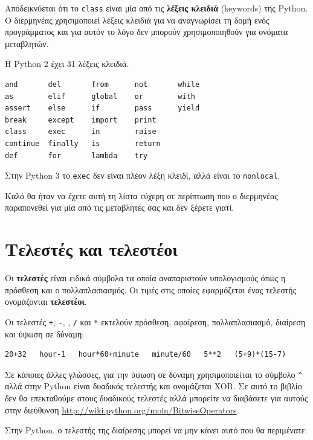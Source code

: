 \documentclass[10pt]{book}
\begin{document}
Αποδεικνύεται ότι το {\tt class} είναι μία από τις {\bf λέξεις κλειδιά} (keywords) της Python. Ο διερμηνέας χρησιμοποιεί λέξεις κλειδιά για να αναγνωρίσει τη δομή ενός προγράμματος και για αυτόν το λόγο δεν μπορούν χρησιμοποιηθούν για ονόματα μεταβλητών.


Η Python 2 έχει 31 λέξεις κλειδιά.

\begin{verbatim}
and       del       from      not       while
as        elif      global    or        with
assert    else      if        pass      yield
break     except    import    print
class     exec      in        raise
continue  finally   is        return
def       for       lambda    try
\end{verbatim}
%

Στην Python 3 το {\tt exec} δεν είναι πλέον λέξη κλειδί, αλλά είναι το 
{\tt nonlocal}.

Καλό θα ήταν να έχετε αυτή τη λίστα εύχερη σε περίπτωση που ο διερμηνέας παραπονεθεί για μία από τις μεταβλητές σας και δεν ξέρετε γιατί.


\section{Τελεστές και τελεστέοι}

Οι {\bf τελεστές} είναι ειδικά σύμβολα τα οποία αναπαριστούν υπολογισμούς
όπως η πρόσθεση και ο πολλαπλασιασμός. Οι τιμές στις οποίες εφαρμόζεται
ένας τελεστής ονομάζονται {\bf τελεστέοι}.

Οι τελεστές {\tt +}, {\tt -}, {\tt *}, {\tt /} και {\tt **}
εκτελούν πρόσθεση, αφαίρεση, πολλαπλασιασμό, διαίρεση και ύψωση σε
δύναμη:


\begin{verbatim}
20+32   hour-1   hour*60+minute   minute/60   5**2   (5+9)*(15-7)
\end{verbatim}
%

Σε κάποιες άλλες γλώσσες, για την ύψωση σε δύναμη χρησιμοποιείται το
σύμβολο \verb"^" αλλά στην Python είναι δυαδικός
τελεστής και ονομάζεται XOR. Σε αυτό το βιβλίο δεν θα επεκταθούμε
στους δυαδικούς τελεστές αλλά μπορείτε να διαβάσετε για αυτούς στην
διεύθυνση \url{http://wiki.python.org/moin/BitwiseOperators}.

Στην Python, ο τελεστής της διαίρεσης μπορεί να μην κάνει
αυτό που θα περιμένατε:
\end{document}
